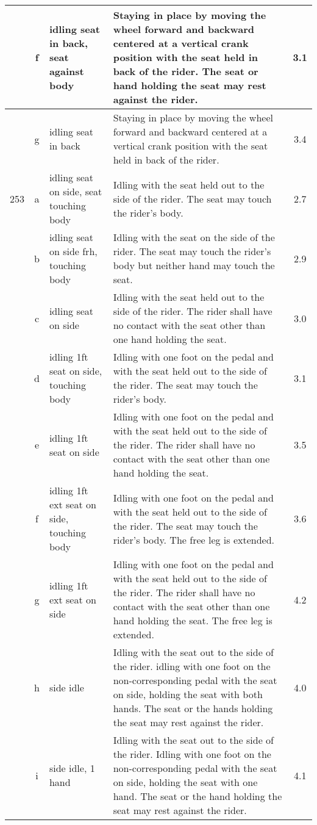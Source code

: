 \begin{longtable}{|r|c|p{4cm}|p{8cm}|c|}
\hline
  & f & idling seat in back, seat against body  & Staying in place by moving the wheel forward and backward centered at a vertical crank position with the seat held in back of the rider. The seat or hand holding the seat may rest against the rider.  & 3.1 \\ 
\hline
  & g & idling seat in back & Staying in place by moving the wheel forward and backward centered at a vertical crank position with the seat held in back of the rider.  & 3.4 \\ 
\hline
253 & a & idling seat on side, seat touching body & Idling with the seat held out to the side of the rider. The seat may touch the rider's body.  & 2.7 \\ 
\hline
  & b & idling seat on side frh, touching body  & Idling with the seat on the side of the rider. The seat may touch the rider's body but neither hand may touch the seat. & 2.9 \\ 
\hline
  & c & idling seat on side & Idling with the seat held out to the side of the rider. The rider shall have no contact with the seat other than one hand holding the seat. & 3.0 \\ 
\hline
  & d & idling 1ft seat on side, touching body  & Idling with one foot on the pedal and with the seat held out to the side of the rider. The seat may touch the rider's body. & 3.1 \\ 
\hline
  & e & idling 1ft seat on side & Idling with one foot on the pedal and with the seat held out to the side of the rider. The rider shall have no contact with the seat other than one hand holding the seat.  & 3.5 \\ 
\hline
  & f & idling 1ft ext seat on side, touching body  & Idling with one foot on the pedal and with the seat held out to the side of the rider. The seat may touch the rider's body. The free leg is extended. & 3.6 \\ 
\hline
  & g & idling 1ft ext seat on side & Idling with one foot on the pedal and with the seat held out to the side of the rider. The rider shall have no contact with the seat other than one hand holding the seat. The free leg is extended.  & 4.2 \\ 
\hline
  & h & side idle & Idling with the seat out to the side of the rider. idling with one foot on the non-corresponding pedal with the seat on side, holding the seat with both hands. The seat or the hands holding the seat may rest against the rider.  & 4.0 \\ 
\hline
  & i & side idle, 1 hand & Idling with the seat out to the side of the rider. Idling with one foot on the non-corresponding pedal with the seat on side, holding the seat with one hand. The seat or the hand holding the seat may rest against the rider. & 4.1 \\ 

\end{longtable}
